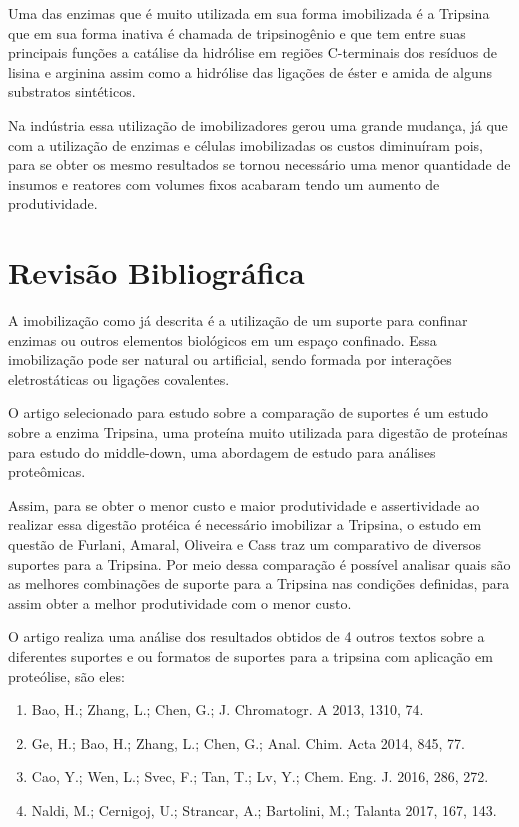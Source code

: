 \documentclass[
	12pt,				%
	openright,			%
	oneside,			%
	a4paper,			%
	english,			%
	french,				%
	spanish,			%
	brazil				%
	]{abntex2}
\begin{document}
Uma das enzimas que é muito utilizada em sua forma imobilizada é a Tripsina que em sua forma inativa é chamada de tripsinogênio e que tem entre suas principais funções a catálise da hidrólise em regiões C-terminais dos resíduos de lisina e arginina assim como a hidrólise das ligações de éster e amida de alguns substratos sintéticos. \cite{furlani2020imobilizaccao}

Na indústria essa utilização de imobilizadores gerou uma grande mudança, já que com a utilização de enzimas e células imobilizadas os custos diminuíram pois, para se obter os mesmo resultados se tornou necessário uma menor quantidade de insumos e reatores com volumes fixos acabaram tendo um aumento de produtividade.

\newpage
\section{Revisão Bibliográfica}
\pagestyle{fancy}

A imobilização como já descrita é a utilização de um suporte para confinar enzimas ou outros elementos biológicos em um espaço confinado. Essa imobilização pode ser natural ou artificial, sendo formada por interações eletrostáticas ou ligações covalentes.

O artigo selecionado para estudo sobre a comparação de suportes é um estudo sobre a enzima Tripsina, uma proteína muito utilizada para digestão de proteínas para estudo do middle-down, uma abordagem de estudo para análises proteômicas.

Assim, para se obter o menor custo e maior produtividade e assertividade ao realizar essa digestão protéica é necessário imobilizar a Tripsina, o estudo em questão de Furlani, Amaral, Oliveira e Cass traz um comparativo de diversos suportes para a Tripsina. Por meio dessa comparação é possível analisar quais são as melhores combinações de suporte para a Tripsina nas condições definidas, para assim obter a melhor produtividade com o menor custo.

O artigo realiza uma análise dos resultados obtidos de 4 outros textos sobre a diferentes suportes e ou formatos de suportes para a tripsina com aplicação em proteólise, são eles:

\begin{enumerate}

\item Bao, H.; Zhang, L.; Chen, G.; J. Chromatogr. A 2013, 1310, 74.
\item Ge, H.; Bao, H.; Zhang, L.; Chen, G.; Anal. Chim. Acta 2014, 845, 77.
\item Cao, Y.; Wen, L.; Svec, F.; Tan, T.; Lv, Y.; Chem. Eng. J. 2016, 286, 272.
\item Naldi, M.; Cernigoj, U.; Strancar, A.; Bartolini, M.; Talanta 2017, 167, 143.

\end{enumerate}
\end{document}
